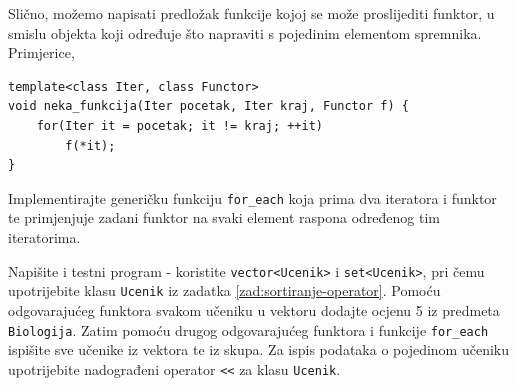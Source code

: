 Slično, možemo napisati predložak funkcije kojoj
se može proslijediti funktor, u smislu objekta
koji određuje što napraviti s pojedinim elementom spremnika.
Primjerice,

\begin{verbatim}
template<class Iter, class Functor>
void neka_funkcija(Iter pocetak, Iter kraj, Functor f) {
    for(Iter it = pocetak; it != kraj; ++it)
        f(*it);
}
\end{verbatim}

\begin{zadatak}\label{zad:for-each}
    Implementirajte generičku funkciju \texttt{for\_each} koja prima
dva iteratora i funktor te primjenjuje zadani funktor na svaki
element raspona određenog tim iteratorima.

Napišite i testni program - koristite \texttt{vector<Ucenik>} i
\texttt{set<Ucenik>}, pri čemu upotrijebite klasu \texttt{Ucenik} iz zadatka \ref{zad:sortiranje-operator}.
Pomoću odgovarajućeg funktora svakom učeniku u vektoru dodajte
ocjenu 5 iz predmeta \texttt{Biologija}. 
Zatim pomoću drugog
odgovarajućeg funktora i funkcije \texttt{for\_each} ispišite sve učenike iz
vektora te iz skupa.
Za ispis podataka o pojedinom učeniku upotrijebite nadograđeni operator \texttt{<\!<} za klasu \texttt{Ucenik}.
\end{zadatak}


